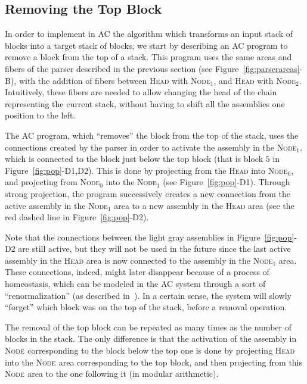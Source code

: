 \documentclass[letterpaper]{article}
\newcommand{\workzone}[1]{\mbox{\textsc{Node}$_{#1}$}\xspace}
\newcommand{\headzone}{\textsc{Head}\xspace}
\begin{document}
 \subsection{Removing the Top Block}

In order to implement in AC the algorithm which transforms an input stack of blocks into a target stack of blocks, we start by describing an AC program to remove a block from the top of a stack. This program uses the same areas and fibers of the parser described in the previous section (see Figure~\ref{fig:parserareas}-B), with the addition of fibers between \headzone with \workzone{1}, and \headzone with \workzone{2}. Intuitively, these fibers are needed to allow changing the head of the chain representing the current stack, without having to shift all the assemblies one position to the left.

The AC program, which ``removes'' the block from the top of the stack, uses the connections created by the parser in order to activate the assembly in the \workzone{1}, which is connected to the block just below the top block (that is block $5$ in Figure~\ref{fig:pop}-D1,D2). This is done by projecting from the \headzone into \workzone{0}, and projecting from \workzone{0} into the \workzone{1} (see Figure~\ref{fig:pop}-D1). Through strong projection, the program successively creates a new connection from the active assembly in the \workzone{1} area to a new assembly in the \headzone area (see the red dashed line in Figure~\ref{fig:pop}-D2).

Note that the connections between the light gray assemblies in Figure~\ref{fig:pop}-D2 are still active, but they will not be used in the future since the last active assembly in the \headzone area is now connected to the assembly in the \workzone{1} area. These connections, indeed, might later disappear because of a process of homeostasis, which can be modeled in the AC system through a sort of ``renormalization'' (as described in~\cite{papadimitriou2020}). In a certain sense, the system will slowly ``forget'' which block was on the top of the stack, before a removal operation.

The removal of the top block can be repeated as many times as the number of blocks in the stack. The only difference is that the activation of the assembly in \workzone{} corresponding to the block below the top one is done by projecting \headzone into the \workzone{} area corresponding to the top block, and then projecting from this \workzone{} area to the one following it (in modular arithmetic).
\end{document}
